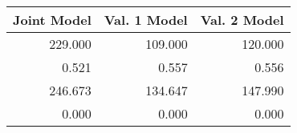 \begin{tabular}{rrr}
\toprule
Joint Model & Val. 1 Model & Val. 2 Model \\
\midrule
229.000 & 109.000 & 120.000 \\
0.521 & 0.557 & 0.556 \\
246.673 & 134.647 & 147.990 \\
0.000 & 0.000 & 0.000 \\
\bottomrule
\end{tabular}
